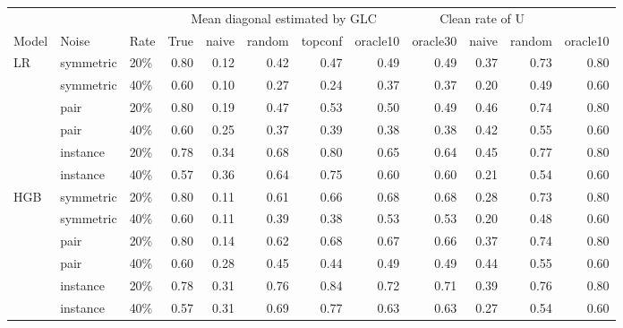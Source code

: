 \begin{tabular}{lllrrrrrrrrr}
\toprule
 & & & \multicolumn{5}{c}{Mean diagonal estimated by GLC} & \multicolumn{3}{c}{Clean rate of U} \\
\cmidrule(lr){4-8} \cmidrule(lr){9-11}
Model & Noise & Rate & True & naive & random & topconf & oracle10 & oracle30 & naive & random & oracle10 \\
\midrule
LR & symmetric & 20\% & 0.80 & 0.12 & 0.42 & 0.47 & 0.49 & 0.49 & 0.37 & 0.73 & 0.80 \\
 & symmetric & 40\% & 0.60 & 0.10 & 0.27 & 0.24 & 0.37 & 0.37 & 0.20 & 0.49 & 0.60 \\
 & pair & 20\% & 0.80 & 0.19 & 0.47 & 0.53 & 0.50 & 0.49 & 0.46 & 0.74 & 0.80 \\
 & pair & 40\% & 0.60 & 0.25 & 0.37 & 0.39 & 0.38 & 0.38 & 0.42 & 0.55 & 0.60 \\
 & instance & 20\% & 0.78 & 0.34 & 0.68 & 0.80 & 0.65 & 0.64 & 0.45 & 0.77 & 0.80 \\
 & instance & 40\% & 0.57 & 0.36 & 0.64 & 0.75 & 0.60 & 0.60 & 0.21 & 0.54 & 0.60 \\
\addlinespace
HGB & symmetric & 20\% & 0.80 & 0.11 & 0.61 & 0.66 & 0.68 & 0.68 & 0.28 & 0.73 & 0.80 \\
 & symmetric & 40\% & 0.60 & 0.11 & 0.39 & 0.38 & 0.53 & 0.53 & 0.20 & 0.48 & 0.60 \\
 & pair & 20\% & 0.80 & 0.14 & 0.62 & 0.68 & 0.67 & 0.66 & 0.37 & 0.74 & 0.80 \\
 & pair & 40\% & 0.60 & 0.28 & 0.45 & 0.44 & 0.49 & 0.49 & 0.44 & 0.55 & 0.60 \\
 & instance & 20\% & 0.78 & 0.31 & 0.76 & 0.84 & 0.72 & 0.71 & 0.39 & 0.76 & 0.80 \\
 & instance & 40\% & 0.57 & 0.31 & 0.69 & 0.77 & 0.63 & 0.63 & 0.27 & 0.54 & 0.60 \\
\bottomrule
\end{tabular}
